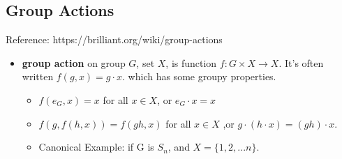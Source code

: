 \documentclass[11pt, oneside]{article}   	%
\begin{document}
\subsection{Group Actions}
Reference: https://brilliant.org/wiki/group-actions
\begin{itemize}
\item \textbf{group action} on group $G$, set $X$, is function $f: G \times X \rightarrow X$.  It's often written $f(g,x) = g \cdot x$. which has some groupy properties.
  \begin{itemize}
  \item $f(e_G, x) = x$ for all $x \in X$, or $e_G \cdot x = x$
  \item $f(g, f(h, x)) = f(gh, x)$ for all $x \in X$ ,or $g \cdot (h \cdot x) = (gh) \cdot x$.
  \item Canonical Example: if G is $S_n$, and $X = \{1, 2, ... n\}$.  
  \end{itemize}


\end{itemize}
\end{document}
